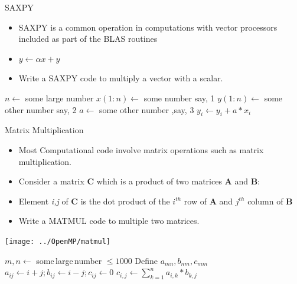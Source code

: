 \documentclass[c,mathserif,compress,xcolor=svgnames]{beamer}
\begin{document}
\begin{frame}{\small SAXPY}
  \begin{itemize}
    \item SAXPY is a common operation in computations with vector processors included as part of the BLAS routines
    \item[] $y\leftarrow \alpha x + y$
    \item Write a SAXPY code to multiply a vector with a scalar.
  \end{itemize}
  \begin{algorithm}[H]
    \caption{Pseudo Code for SAXPY}
    \begin{algorithmic}
      \State $n \gets$ some large number
      \State $x(1:n) \gets$ some number say, 1
      \State $y(1:n) \gets$ some other number say, 2
      \State $a \gets$ some other number ,say, 3
      \State $y_i \gets y_i + a * x_i$
      \EndDo
    \end{algorithmic}
  \end{algorithm}
\end{frame}

\begin{frame}[allowframebreaks]{Matrix Multiplication}
  \begin{itemize}
    \item Most Computational code involve matrix operations such as matrix multiplication.
    \item Consider a matrix {\bf C} which is a product of two matrices {\bf A} and {\bf B}:
    \item[] Element {\it i,j} of {\bf C} is the dot product of the $i^{th}$ row of {\bf A} and $j^{th}$ column of {\bf B}
    \item Write a MATMUL code to multiple two matrices.
  \end{itemize}
  \begin{center}
    \texttt{[image: ../OpenMP/matmul]}
  \end{center}

  \begin{algorithm}[H]
    \caption{Pseudo Code for MATMUL}
    \begin{algorithmic}
      \State $m,n \gets$ some\,large\,number $\le 1000$
      \State Define $a_{mn}, b_{nm}, c_{mm}$
      \State $a_{ij} \gets i+j; b_{ij} \gets i-j; c_{ij} \gets 0$
      \State $c_{i,j} \gets \sum^{n}_{k=1} a_{i,k}*b_{k,j}$
      \EndDo
      \EndDo
    \end{algorithmic}
  \end{algorithm}
\end{frame}
\end{document}
